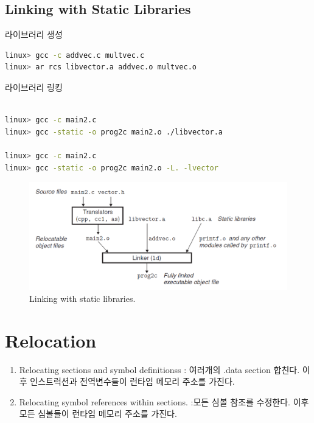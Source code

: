 \subsection{Linking with Static Libraries}

라이브러리 생성

\begin{lstlisting}[language=bash]
linux> gcc -c addvec.c multvec.c
linux> ar rcs libvector.a addvec.o multvec.o
\end{lstlisting}

라이브러리 링킹

\begin{lstlisting}[language=bash]
    
linux> gcc -c main2.c
linux> gcc -static -o prog2c main2.o ./libvector.a

linux> gcc -c main2.c
linux> gcc -static -o prog2c main2.o -L. -lvector

\end{lstlisting}

\begin{figure}[h!]
    \centering
    \includegraphics[scale=0.5]{pic/section7/pic3.png}
    \caption{Linking with static libraries.}
\end{figure}




\section{Relocation}

\begin{enumerate}
    \item Relocating sections and symbol definitionss :  여러개의 .data section 합친다. 이후 인스트럭션과 전역변수들이 런타임 메모리 주소를 가진다.
    \item Relocating symbol references within sections. :모든 심볼 참조를 수정한다. 이후  
    모든 심볼들이 런타임 메모리 주소를 가진다.
\end{enumerate}


